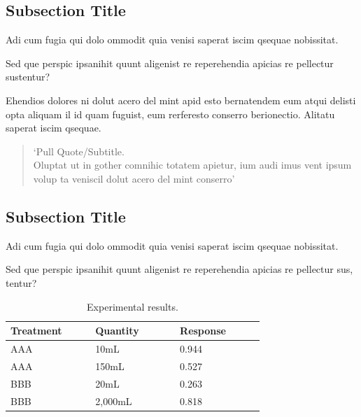 \documentclass[
	landscape,       %
]{ImperialPoster}
\begin{document}
\titlesection{} %

\medskip %

\begin{multicols}{4} %

	\subsection{Subsection Title}

	Adi cum fugia qui dolo ommodit quia venisi saperat iscim qsequae nobissitat.

	Sed que perspic ipsanihit quunt aligenist re reperehendia \textcolor{ICLGreen}{apicias re pellectur sustentur?}

	Ehendios \textcolor{ICLGreen}{dolores} ni dolut acero del mint apid esto bernatendem eum \textcolor{ICLGreen}{atqui delisti opta} aliquam il id quam fuguist, eum rerferesto conserro berionectio. Alitatu saperat iscim qsequae.

	\begin{quote}
		`Pull Quote/Subtitle.\\
		Oluptat ut in gother comnihic totatem apietur, ium audi imus vent ipsum volup ta veniscil dolut acero del mint conserro'
	\end{quote}

	\subsection{Subsection Title}

	Adi cum fugia qui dolo ommodit quia venisi saperat iscim qsequae nobissitat.

	Sed que perspic ipsanihit quunt aligenist re reperehendia apicias re pellectur sus, tentur?

	\begin{table}[H] %
		\caption{Experimental results.}
		\begin{tabular}{L{0.24\linewidth} C{0.24\linewidth} R{0.24\linewidth}}
			\toprule
			Treatment & Quantity & Response\\
			\midrule
			AAA & 10mL & 0.944\\
			AAA & 150mL & 0.527\\
			BBB & 20mL & 0.263\\
			BBB & 2,000mL & 0.818\\
			\bottomrule
		\end{tabular}
	\end{table}


\end{multicols}
\end{document}
